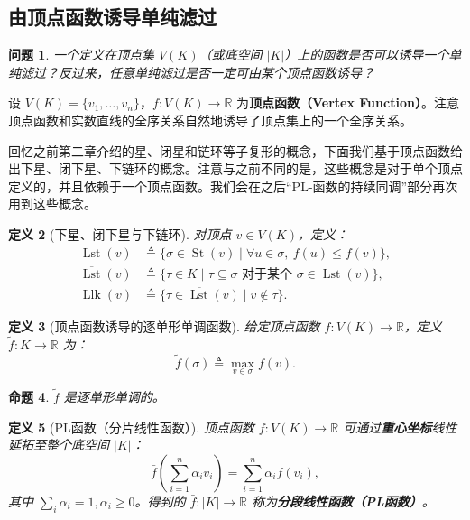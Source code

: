\documentclass[UTF8]{ctexart}
\newtheorem{definition}{定义}[section]
\newtheorem{proposition}[definition]{命题}
\newtheorem{question}[definition]{问题}
\begin{document}
\subsection{由顶点函数诱导单纯滤过}
\label{subsec:vertex-filtration}

\begin{question}
一个定义在顶点集 \(V(K)\)（或底空间 \(|K|\)）上的函数是否可以诱导一个单纯滤过？反过来，任意单纯滤过是否一定可由某个顶点函数诱导？
\end{question}

设 \(V(K) = \{v_1, \dots, v_n\}\)，\(f: V(K) \to \mathbb{R}\) 为\textbf{顶点函数（Vertex Function）}。注意顶点函数和实数直线的全序关系自然地诱导了顶点集上的一个全序关系。

回忆之前第二章介绍的星、闭星和链环等子复形的概念，下面我们基于顶点函数给出下星、闭下星、下链环的概念。注意与之前不同的是，这些概念是对于单个顶点定义的，并且依赖于一个顶点函数。我们会在之后“PL-函数的持续同调”部分再次用到这些概念。

\begin{definition}[下星、闭下星与下链环]
\label{def:lower-star}
对顶点 \(v \in V(K)\)，定义：
\begin{align*}
\operatorname{Lst}(v) &\triangleq \{\sigma \in \operatorname{St}(v) \mid \forall u \in \sigma,\ f(u) \le f(v)\}, \\
\overline{\operatorname{Lst}}(v) &\triangleq \{\tau \in K \mid \tau \subseteq \sigma \text{ 对于某个 } \sigma \in \operatorname{Lst}(v)\}, \\
\operatorname{Llk}(v) &\triangleq \{\tau \in \overline{\operatorname{Lst}}(v) \mid v \notin \tau\}.
\end{align*}
\end{definition}

\begin{definition}[顶点函数诱导的逐单形单调函数]
\label{def:induced-monotone}
给定顶点函数 \(f: V(K) \to \mathbb{R}\)，定义 \(\tilde{f}: K \to \mathbb{R}\) 为：
\[
\tilde{f}(\sigma) \triangleq \max_{v \in \sigma} f(v).
\]
\end{definition}

\begin{proposition}
\label{prop:induced-monotone}
\(\tilde{f}\) 是逐单形单调的。
\end{proposition}

\begin{definition}[PL函数（分片线性函数）]
\label{def:pl-function}
顶点函数 \(f: V(K) \to \mathbb{R}\) 可通过\textbf{重心坐标}线性延拓至整个底空间 \(|K|\)：
\[
\bar{f}\left(\sum_{i=1}^n \alpha_i v_i\right) = \sum_{i=1}^n \alpha_i f(v_i),
\]
其中 \(\sum_i \alpha_i = 1, \alpha_i \ge 0\)。得到的 \(\bar{f}: |K| \to \mathbb{R}\) 称为\textbf{分段线性函数（PL函数）}。
\end{definition}
\end{document}
